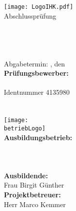\begin{titlepage}

\begin{center}
\texttt{[image: LogoIHK.pdf]}\\[1ex]
\Large{Abschlussprüfung \pruefungstermin}\\[3ex]

\Large{\ausbildungsberuf}\\
\LARGE{\betreff}\\[4ex]

\huge{\textbf{\titel}}\\[1.5ex]
\Large{\textbf{\untertitel}}\\[4ex]

\normalsize
Abgabetermin: \abgabeOrt, den \abgabeTermin\\[3em]
\textbf{Prüfungsbewerber:}\\
\autorName\\
Identnummer 4135980\\
\autorAnschrift\\
\autorOrt\\[5ex]

\texttt{[image: \\betriebLogo]}\\[2ex]
\textbf{Ausbildungsbetrieb:}\\
\betriebName\\
\betriebAnschrift\\
\betriebOrt\\[2em]
\textbf{Ausbildende:}\\
Frau Birgit Günther\\[1em]
\textbf{Projektbetreuer:}\\
Herr Marco Kemmer\\
\end{center}

\small
\noindent

\end{titlepage}